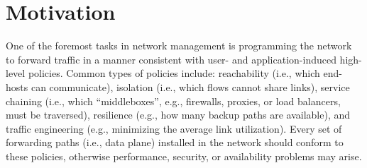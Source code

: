 \section{Motivation} \label{sec:motivation}

One of the foremost tasks in network management is programming the
network to forward traffic in a manner consistent with user- and
application-induced high-level policies. Common types of policies
include: reachability (i.e., which end-hosts can communicate),
isolation (i.e., which flows cannot share links), service chaining
(i.e., which ``middleboxes'', e.g., firewalls, proxies, or load
balancers, must be traversed), resilience (e.g., how many backup paths
are available), and traffic engineering (e.g., minimizing the average
link utilization). Every set of forwarding paths (i.e., data plane)
installed in the network
should conform to these 
policies, otherwise performance, security, or availability problems may arise.

